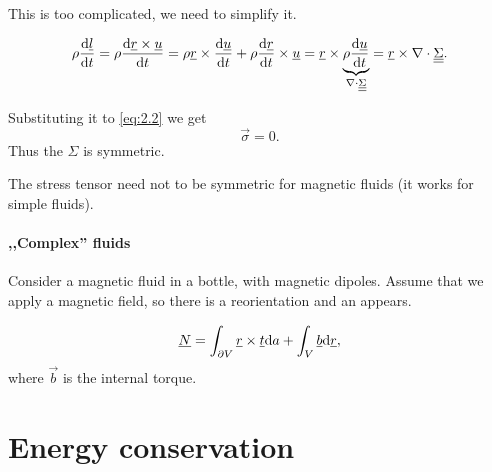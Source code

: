 \documentclass[../main.tex]{subfiles}
\begin{document}
    This is too complicated, we need to simplify it.
    
    \begin{displaymath}
      \rho \frac{\mathrm{d}  \underline{l} }{\mathrm{d} t} = \rho \frac{\mathrm{d} \underline{r} \times \underline{u}}{\mathrm{d} t} 
      = \rho \underline{r} \times \frac{\mathrm{d} \underline{u}}{\mathrm{d} t} + \rho \frac{\mathrm{d}  \underline{r} }{\mathrm{d} t} \times \underline{u}
      = \underline{r} \times \underbrace{\rho \frac{\mathrm{d} \underline{u}}{\mathrm{d} t}}_{\nabla \cdot \underline{\underline{{\Sigma}}}} 
      = \underline{r} \times \nabla \cdot \underline{\underline{{\Sigma}}}.
    \end{displaymath}

    Substituting it to  \ref{eq:2.2} we get
    \begin{displaymath}
      \vec \sigma = 0.
    \end{displaymath}
    Thus the $\Sigma $ is symmetric.

    The stress tensor need not to be symmetric for magnetic fluids (it works for simple fluids).


    \paragraph{,,Complex'' fluids}

    Consider a magnetic fluid in a bottle, with magnetic dipoles.
    Assume that we apply a magnetic field, so there is a reorientation and an  appears.
    
    \begin{displaymath}
      \underline{N} = \int_{\partial V} \underline{r} \times \underline{t} \mathrm{d} a + \int_{V} \underline{b} \mathrm{d} \underline{r},
    \end{displaymath}
    where $\vec b$ is the internal torque.
    
    
    \section{Energy conservation}
    \begin{figure}
      \centering
    \end{figure}
\end{document}
